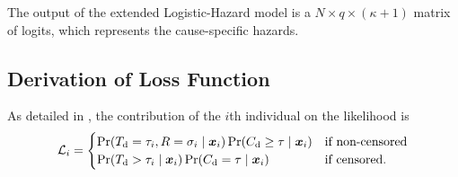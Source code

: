 \begin{marginfigure}
\caption[Illustration of the extended Logistic-Hazard model]{
    The output of the extended Logistic-Hazard model is a
    \(N \times q \times (\kappa + 1)\) matrix of logits, which 
    represents the cause-specific hazards.}
\label{fig:ext-loghaz}
\end{marginfigure}%

\subsection{Derivation of Loss Function}
\newcommand{\lambdanull}[1]{\lambda_\varnothing(#1 \giv \vec{x}_i)}

As detailed in \textcite{tutzModeling2016}, 
the contribution of 
the \(i\)th individual on the likelihood is
%
\begin{equation}
    \mathcal{L}_{i} =
    \begin{cases}
        \Pr({T_{\mathrm{d}}} = \tau_{i}, R = \sigma_i \mid \bm{x}_i) 
        \Pr({C_{\mathrm{d}}} \geq \tau \mid \bm{x}_i) 
        & \text{if non-censored} \\
        \Pr({T_{\mathrm{d}}} > \tau_{i} \mid \bm{x}_i) 
        \Pr({C_{\mathrm{d}}} = \tau \mid \bm{x}_i)                  
        & \text{if censored.}
    \end{cases}
\end{equation}

